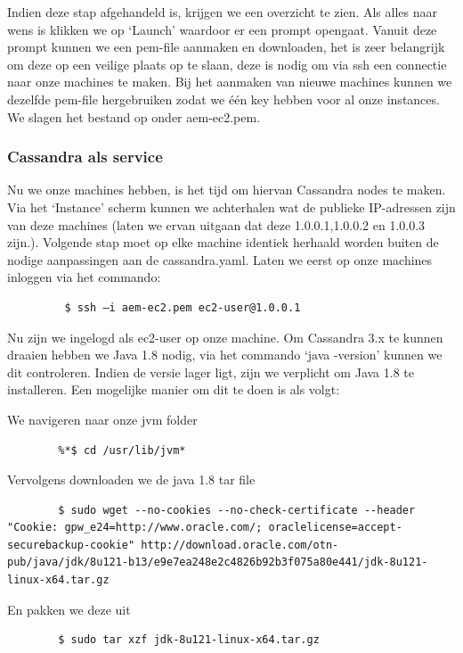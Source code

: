 \documentclass{article}
\begin{document}
	\par
	Indien deze stap afgehandeld is, krijgen we een overzicht te zien. 
	Als alles naar wens is klikken we op ‘Launch’ waardoor er een prompt opengaat. 
	Vanuit deze prompt kunnen we een pem-file aanmaken en downloaden, het is zeer belangrijk om 
	deze op een veilige plaats op te slaan, deze is nodig om via ssh een connectie naar onze machines te maken. 
	Bij het aanmaken van nieuwe machines kunnen we dezelfde pem-file hergebruiken zodat we \'e\'en key hebben voor al onze instances.
	 We slagen het bestand op onder aem-ec2.pem.
	
	\subsubsection{Cassandra als service}
	Nu we onze machines hebben, is het tijd om hiervan Cassandra nodes te maken. 
	Via het ‘Instance’ scherm kunnen we achterhalen wat de publieke IP-adressen zijn van deze machines 
	(laten we ervan uitgaan dat deze 1.0.0.1,1.0.0.2 en 1.0.0.3 zijn.). 
	Volgende stap moet op elke machine identiek herhaald worden buiten de nodige aanpassingen aan de cassandra.yaml. 
	Laten we eerst op onze machines inloggen via het commando:
	
	\begin{lstlisting}
		 $ ssh –i aem-ec2.pem ec2-user@1.0.0.1
	\end{lstlisting}
	
	Nu zijn we ingelogd als ec2-user op onze machine. Om Cassandra 3.x te kunnen draaien hebben we Java 1.8 nodig, 
	via het commando ‘java -version’ kunnen we dit controleren. 
	Indien de versie lager ligt, zijn we verplicht om Java 1.8 te installeren. Een mogelijke manier om dit te doen is als volgt:	
	\par
	We navigeren naar onze jvm folder
	\begin{lstlisting}
  		%*$ cd /usr/lib/jvm*
	\end{lstlisting}
	\par
	Vervolgens downloaden we de java 1.8 tar file
	\begin{lstlisting}
		$ sudo wget --no-cookies --no-check-certificate --header "Cookie: gpw_e24=http://www.oracle.com/; oraclelicense=accept-securebackup-cookie" http://download.oracle.com/otn-pub/java/jdk/8u121-b13/e9e7ea248e2c4826b92b3f075a80e441/jdk-8u121-linux-x64.tar.gz
	\end{lstlisting}
	
	\par
	En pakken we deze uit
	\begin{lstlisting}
		$ sudo tar xzf jdk-8u121-linux-x64.tar.gz
	\end{lstlisting}
	
\end{document}
